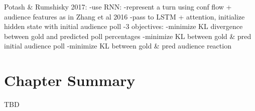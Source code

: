Potash & Rumshisky 2017:
-use RNN:
	-represent a turn using conf flow + audience features as in Zhang et al 2016
	-pass to LSTM + attention, initialize hidden state with initial audience poll
	-3 objectives: 
		-minimize KL divergence between gold and predicted poll percentages
		-minimize KL between gold & pred initial audience poll
		-minimize KL between gold & pred audience reaction

\section{Chapter Summary}

TBD